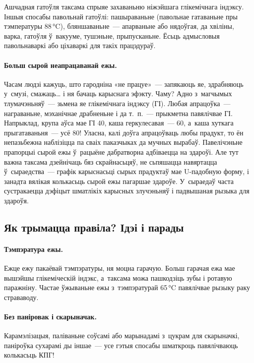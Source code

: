 Ашчадная гатоўля таксама спрыяе захаваньню ніжэйшага глікемічнага індэксу. Іншыя спосабы павольнай гатоўлі: пашыраваньне (павольнае гатаваньне пры тэмпературы 88\,°C), бляншаваньне~--- апарваньне або нядоўгая, да хвіліны, варка, гатоўля ў~вакууме, тушэньне, прыпусканьне. Ёсьць адмысловыя павольнаваркі або ціхаваркі для такіх працэдураў.

\paragraph{Больш сырой неапрацаванай ежы.}
Часам людзі кажуць, што гародніна «не працуе»~--- запякаюць яе, здрабняюць у~смузі, смажаць… і ня бачаць карыснага эфэкту. Чаму? Адно з~магчымых тлумачэньняў~--- зьмена яе глікемічнага індэксу (ГІ). Любая апрацоўка~--- награваньне, мэханічнае драбненьне і да т.~п.~--- прыкметна павялічвае ГІ. Напрыклад, крупа аўса мае ГІ 40, каша геркулесавая~--- 60, а~каша хуткага прыгатаваньня~--- усё 80! Уласна, калі доўга апрацоўваць любы прадукт, то ён непазьбежна наблізіцца па сваіх паказчыках да мучных вырабаў. Павелічэньне прапорцыі сырой ежы ў~рацыёне дабратворна адбіваецца на здароўі. Але тут важна таксама дзейнічаць бяз скрайнасьцяў, не сьпяшацца навяртацца ў~сыраедства~--- графік карыснасьці сырых прадуктаў мае U-падобную форму, і занадта вялікая колькасьць сырой ежы пагаршае здароўе. У~сыраедаў часта сустракаецца дэфіцыт шматлікіх карысных злучэньняў і падвышаная рызыка для здароўя.

\subsection{Як трымацца правіла? Ідэі і парады}

\paragraph{Тэмпэратура ежы.}
Ежце ежу пакаёвай тэмпэратуры, ня моцна гарачую. Больш гарачая ежа мае вышэйшы глікеміческій індэкс, а~таксама можа пашкодзіць зубы і ротавую паражніну. Частае ўжываньне ежы з~тэмпэратурай 65\,°C павялічвае рызыку раку страваводу.

\paragraph{Без паніровак і скарыначак.}
Карамэлізацыя, паліваньне соўсамі або марынадамі з~цукрам для скарыначкі, паніроўка сухарамі ды іншае~--- усе гэтыя спосабы шматкроць павялічваюць колькасьць КПГ!

